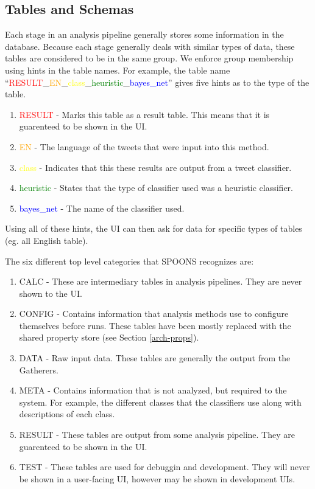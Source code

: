 \documentclass[12pt]{ucthesis}
\begin{document}
\subsection{Tables and Schemas}
\label{arch-database-tables}
Each stage in an analysis pipeline generally stores some information in the database. Because each stage generally deals with similar
types of data, these tables are considered to be in the same group. We enforce group membership using hints in the table names. For example, the
table name ``\textcolor{red}{RESULT}\_\textcolor{orange}{EN}\_\textcolor{yellow}{class}\_\textcolor{green}{heuristic}\_\textcolor{blue}{bayes\_net}''
gives five hints as to the type of the table.

\begin{enumerate}
   \item \textcolor{red}{RESULT} - Marks this table as a result table. This means that it is guarenteed to be shown in the UI.
   \item \textcolor{orange}{EN} - The language of the tweets that were input into this method.
   \item \textcolor{yellow}{class} - Indicates that this these results are output from a tweet classifier.
   \item \textcolor{green}{heuristic} - States that the type of classifier used was a heuristic classifier.
   \item \textcolor{blue}{bayes\_net} - The name of the classifier used.
\end{enumerate}

Using all of these hints, the UI can then ask for data for specific types of tables (eg. all English table).

The six different top level categories that SPOONS recognizes are:

\begin{enumerate}
   \item CALC - These are intermediary tables in analysis pipelines. They are never shown to the UI.
   \item CONFIG - Contains information that analysis methods use to configure themselves before runs. These tables have been mostly replaced with the shared property store (see Section \ref{arch-props}).
   \item DATA - Raw input data. These tables are generally the output from the Gatherers.
   \item META - Contains information that is not analyzed, but required to the system. For example, the different classes that the classifiers use along with descriptions of each class.
   \item RESULT - These tables are output from some analysis pipeline. They are guarenteed to be shown in the UI.
   \item TEST - These tables are used for debuggin and development. They will never be shown in a user-facing UI, however may be shown in development UIs.
\end{enumerate}
\end{document}
